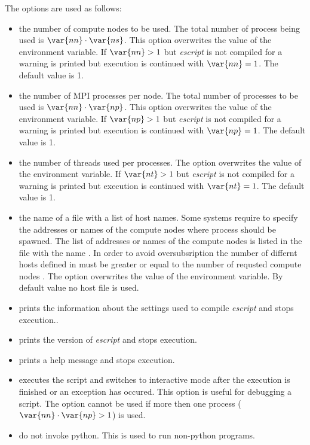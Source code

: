 The options are used as follows:
\begin{itemize}

 \item[\programopt{-n} \var{nn}] the number of compute nodes  to be used. The total number of process being used is 
$\var{nn} \cdot \var{ns}$. This option overwrites the value of the  environment variable. If $\var{nn}>1$ but {\it escript}  is not compiled for \MPI a warning is printed but execution is continued with $\var{nn}=1$. The default value is 1.
 
\item[\programopt{-p} \var{np}] the number of MPI processes per node.  The total number of processes to be used is 
$\var{nn} \cdot \var{np}$. This option overwrites the value of the  environment variable. If $\var{np}>1$ but {\it escript}  is not compiled for \MPI a warning is printed but execution is continued with $\var{np}=1$. The default value is 1.

 \item[\programopt{-t} \var{nt}] the number of threads used per processes.
The option overwrites the value of the  environment variable.
If $\var{nt}>1$ but {\it escript} is not compiled for \OPENMP a warning is printed but execution is continued with $\var{nt}=1$. The default value is 1.

 \item[\programopt{-f} \var{hostfile}] the name of a file with a list of host names. Some systems require to specify the addresses or names of the compute nodes where \MPI process should be spawned. The list of addresses or names of the compute nodes is listed in the file with the name . In order to avoid oversubsription the number of differnt
hosts defined in  must be greater or equal to the number of requsted compute nodes . The option overwrites the value of the  environment variable. By default value no host file is used.
 \item[\programopt{-c}] prints the information about the settings used to compile {\it escript} and stops execution..
 \item[\programopt{-V}] prints the version of {\it escript} and stops execution.
 \item[\programopt{-h}] prints a help message and stops execution.
 \item[\programopt{-i}] executes the script  and switches to interactive mode after the execution is finished or an exception has occured. This option is useful for debugging a script. The option cannot be used if more then one process ($\var{nn} \cdot \var{np}>1$) is used.
\item[\programopt{-b}] do not invoke python. This is used to run non-python programs.


\end{itemize}
